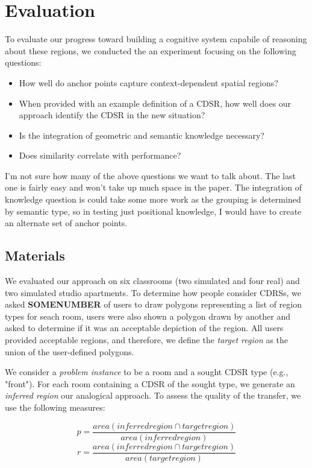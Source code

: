 \section{Evaluation}\label{sec:evaluation}


To evaluate our progress toward building a cognitive system capabile of reasoning about these regions, we conducted the an experiment focusing on the following questions:
\begin{itemize}
\item{How well do anchor points capture context-dependent spatial regions?}
\item{When provided with an example definition of a CDSR, how well does our approach identify the CDSR in the new situation?}
\item{Is the integration of geometric and semantic knowledge necessary?}
\item{Does similarity correlate with performance?}
\end{itemize}

I'm not sure how many of the above questions we want to talk about. The last one is fairly easy and won't take up much space in the paper. The integration of knowledge question is could take some more work as the grouping is determined by semantic type, so in testing just positional knowledge,  I would have to create an alternate set of anchor points.

\subsection{Materials}
We evaluated our approach on six classrooms (two simulated and four real) and two simulated studio apartments. To determine how people consider CDRSs, we asked \textbf{SOMENUMBER} of users to draw polygons representing a list of region types for seach room, users were also shown a polygon drawn by another and asked to determine if it was an acceptable depiction of the region. All users provided acceptable regions, and therefore, we define the \textit{target region} as the union of the user-defined polygons.

We consider a \textit{problem instance} to be a room and a sought CDSR type (e.g., "front"). For each room containing a CDSR of the sought type, we generate an \textit{inferred region} our analogical approach. To assess the quality of the transfer, we use the following measures:

\begin{equation}
	p=\frac{area(inferred region \cap target region)}{area(inferred region)}
\end{equation}
\begin{equation}
	r=\frac{area(inferred region \cap target region)}{area(target region)}
\end{equation}

